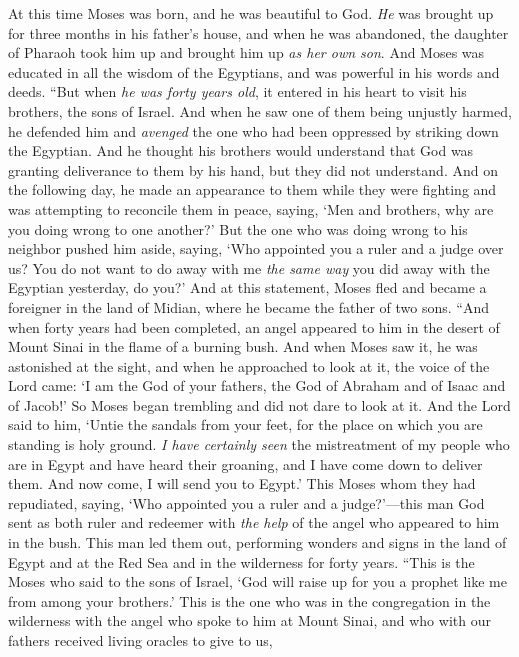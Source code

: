 \begin{biblechapter}
\verse At this time Moses was born, and he was beautiful to God. \textit{He} was brought up for three months in his father’s house,
\verse and when he was abandoned, the daughter of Pharaoh took him up and brought him up \textit{as her own son}.
\verse And Moses was educated in all the wisdom of the Egyptians, and was powerful in his words and deeds.
\verse “But when \textit{he was forty years old}, it entered in his heart to visit his brothers, the sons of Israel.
\verse And when he saw one of them being unjustly harmed, he defended him and \textit{avenged} the one who had been oppressed by striking down the Egyptian.
\verse And he thought his brothers would understand that God was granting deliverance to them by his hand, but they did not understand.
\verse And on the following day, he made an appearance to them while they were fighting and was attempting to reconcile them in peace, saying, ‘Men and brothers, why are you doing wrong to one another?’
\verse But the one who was doing wrong to his neighbor pushed him aside, saying, ‘Who appointed you a ruler and a judge over us?
\verse You do not want to do away with me \textit{the same way} you did away with the Egyptian yesterday, do you?’
\verse And at this statement, Moses fled and became a foreigner in the land of Midian, where he became the father of two sons.
\verse “And when forty years had been completed, an angel appeared to him in the desert of Mount Sinai in the flame of a burning bush.
\verse And when Moses saw it, he was astonished at the sight, and when he approached to look at it, the voice of the Lord came:
\verse ‘I am the God of your fathers, the God of Abraham and of Isaac and of Jacob!’ So Moses began trembling and did not dare to look at it.
\verse And the Lord said to him, ‘Untie the sandals from your feet, for the place on which you are standing is holy ground.
\verse \textit{I have certainly seen} the mistreatment of my people who are in Egypt and have heard their groaning, and I have come down to deliver them. And now come, I will send you to Egypt.’
\verse This Moses whom they had repudiated, saying, ‘Who appointed you a ruler and a judge?’—this man God sent as both ruler and redeemer with \textit{the help} of the angel who appeared to him in the bush.
\verse This man led them out, performing wonders and signs in the land of Egypt and at the Red Sea and in the wilderness for forty years.
\verse “This is the Moses who said to the sons of Israel, ‘God will raise up for you a prophet like me from among your brothers.’
\verse This is the one who was in the congregation in the wilderness with the angel who spoke to him at Mount Sinai, and who with our fathers received living oracles to give to us,

\end{biblechapter}
